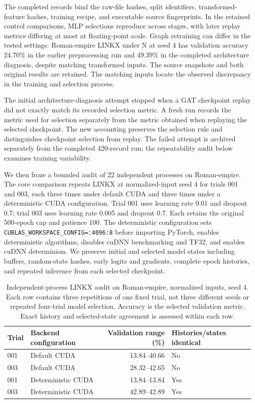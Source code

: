 The completed records bind the raw-file hashes, split identifiers, transformed-feature hashes, training recipe, and executable source fingerprints. In the retained control comparisons, MLP selections reproduce across stages, with later replay metrics differing at most at floating-point scale. Graph retraining can differ in the tested settings: Roman-empire LINKX under N at seed 4 has validation accuracy 24.70\% in the earlier preprocessing run and 49.39\% in the completed architecture diagnosis, despite matching transformed inputs. The source snapshots and both original results are retained. The matching inputs locate the observed discrepancy in the training and selection process.

The initial architecture-diagnosis attempt stopped when a GAT checkpoint replay did not exactly match its recorded selection metric. A fresh run records the metric used for selection separately from the metric obtained when replaying the selected checkpoint. The new accounting preserves the selection rule and distinguishes checkpoint selection from replay. The failed attempt is archived separately from the completed 420-record run; the repeatability audit below examines training variability.

We then froze a bounded audit of 22 independent processes on Roman-empire. The core comparison repeats LINKX at normalized-input seed 4 for trials 001 and 003, each three times under default CUDA and three times under a deterministic CUDA configuration. Trial 001 uses learning rate 0.01 and dropout 0.7; trial 003 uses learning rate 0.005 and dropout 0.7. Each retains the original 500-epoch cap and patience 100. The deterministic configuration sets \texttt{CUBLAS\_WORKSPACE\_CONFIG=:4096:8} before importing PyTorch, enables deterministic algorithms, disables cuDNN benchmarking and TF32, and enables cuDNN determinism. We preserve initial and selected model states including buffers, random-state hashes, early logits and gradients, complete epoch histories, and repeated inference from each selected checkpoint.

\begin{table}[ht]
\centering
\caption{Independent-process LINKX audit on Roman-empire, normalized inputs, seed 4. Each row contains three repetitions of one fixed trial, not three different seeds or repeated four-trial model selection. Accuracy is the selected validation metric. Exact history and selected-state agreement is assessed within each row.}
\label{tab:training_reproducibility}
\small
\begin{tabular}{@{}llrl@{}}
\toprule
Trial & Backend configuration & Validation range (\%) & Histories/states identical \\
\midrule
001 & Default CUDA & 13.84--40.66 & No \\
003 & Default CUDA & 28.32--42.65 & No \\
001 & Deterministic CUDA & 13.84--13.84 & Yes \\
003 & Deterministic CUDA & 42.89--42.89 & Yes \\
\bottomrule
\end{tabular}
\end{table}

